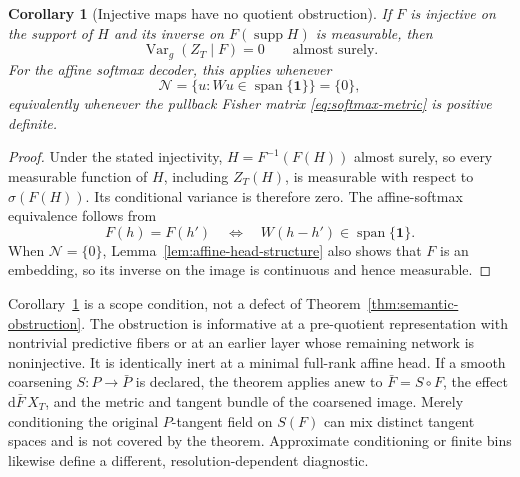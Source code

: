 \documentclass[11pt]{article}
\newtheorem{corollary}[theorem]{Corollary}
\theoremstyle{definition}
\theoremstyle{remark}
\newcommand{\Var}{\operatorname{Var}}
\newcommand{\dd}{\mathrm{d}}
\begin{document}
\begin{corollary}[Injective maps have no quotient obstruction]\label{cor:injective-obstruction}
If $F$ is injective on the support of $H$ and its inverse on $F(\operatorname{supp}H)$ is measurable, then
\begin{equation}
    \Var_g(Z_T\mid F)=0
    \qquad\text{almost surely}.
\end{equation}
For the affine softmax decoder, this applies whenever
\begin{equation}
    \mathcal N=\{u:Wu\in\operatorname{span}\{\bm 1\}\}=\{0\},
\end{equation}
equivalently whenever the pullback Fisher matrix \eqref{eq:softmax-metric} is positive definite.
\end{corollary}

\begin{proof}
Under the stated injectivity, $H=F^{-1}(F(H))$ almost surely, so every measurable function of $H$, including $Z_T(H)$, is measurable with respect to $\sigma(F(H))$. Its conditional variance is therefore zero. The affine-softmax equivalence follows from
\begin{equation}
    F(h)=F(h')
    \quad\Longleftrightarrow\quad
    W(h-h')\in\operatorname{span}\{\bm 1\}.
\end{equation}
When $\mathcal N=\{0\}$, Lemma~\ref{lem:affine-head-structure} also shows that
$F$ is an embedding, so its inverse on the image is continuous and hence
measurable.
\end{proof}

Corollary~\ref{cor:injective-obstruction} is a scope condition, not a defect of Theorem~\ref{thm:semantic-obstruction}. The obstruction is informative at a pre-quotient representation with nontrivial predictive fibers or at an earlier layer whose remaining network is noninjective. It is identically inert at a minimal full-rank affine head. If a smooth coarsening $S:P\to\bar P$ is declared, the theorem applies anew to $\bar F=S\circ F$, the effect $\dd\bar F\,X_T$, and the metric and tangent bundle of the coarsened image. Merely conditioning the original $P$-tangent field on $S(F)$ can mix distinct tangent spaces and is not covered by the theorem. Approximate conditioning or finite bins likewise define a different, resolution-dependent diagnostic.
\end{document}
